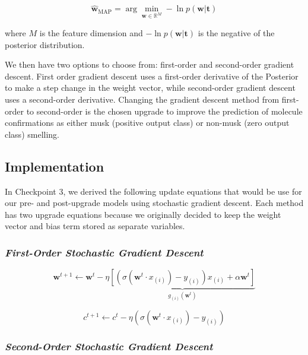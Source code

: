 \documentclass[11pt]{extarticle}
\begin{document}
\begin{equation}
\hat{\textbf{w}}_{\mathrm{MAP}} = \arg\min_{\textbf{w} \in \mathbb{R}^M} -\ln p(\textbf{w}|\textbf{t}) 
\end{equation}

where $M$ is the feature dimension and $-\ln p(\textbf{w}|\textbf{t})$ is the negative of the posterior distribution.

We then have two options to choose from: first-order and second-order gradient descent. First order gradient descent uses a first-order derivative of the Posterior to make a step change in the weight vector, while second-order gradient descent uses a second-order derivative. Changing the gradient descent method from first-order to second-order is the chosen upgrade to improve the prediction of molecule confirmations as either musk (positive output class) or non-musk (zero output class) smelling.

\subsection{Implementation}

In Checkpoint 3, we derived the following update equations that would be use for our pre- and post-upgrade models using stochastic gradient descent. Each method has two upgrade equations because we originally decided to keep the weight vector and bias term stored as separate variables.

\subsubsection{\textit{First-Order Stochastic Gradient Descent}}

\begin{equation}
\mathbf{w}^{t+1} \leftarrow \mathbf{w}^{t} - \eta \underbrace{\left[ \left(\sigma(\mathbf{w}^t \cdot x_{(i)}) - y_{(i)}\right) x_{(i)} + \alpha \mathbf{w}^{t} \right]}_{g_{(i)}(\mathbf{w}^t)}
\end{equation}

\begin{equation}
c^{t+1} \leftarrow c^{t} - \eta (\sigma(\mathbf{w}^t \cdot x_{(i)}) - y_{(i)})
\end{equation}

\subsubsection{\textit{Second-Order Stochastic Gradient Descent}}
\end{document}
